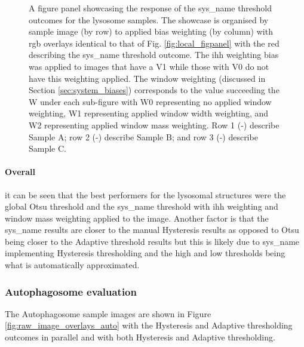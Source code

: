 \begin{figure}[h!]
    \caption[Figure panel showcasing the response of the different weighting biases on the system threshold outcomes for the lysosome samples]{A figure panel showcasing the response of the \gls{sys_name} threshold outcomes for the lysosome samples. The showcase is organised by sample image (by row) to applied bias weighting (by column) with \gls{rgb} overlays identical to that of Fig. \ref{fig:local_figpanel} with the red describing the \gls{sys_name} threshold outcome. The \gls{ihh} weighting bias was applied to images that have a V1 while those with V0 do not have this weighting applied. The window weighting (discussed in Section \ref{sec:system_biases}) corresponds to the value succeeding the W under each sub-figure with W0 representing no applied window weighting, W1 representing applied window width weighting, and W2 representing applied window mass weighting. Row 1 (-) describe Sample A; row 2 (-) describe Sample B; and row 3 (-) describe Sample C.} 
    \label{fig:local_ihh_figpanel}
\end{figure}

\paragraph{Overall} it can be seen that the best performers for the lysosomal structures were the global Otsu threshold and the \gls{sys_name} threshold with \gls{ihh} weighting and window mass weighting applied to the image. Another factor is that the \gls{sys_name} results are closer to the manual Hysteresis results as opposed to Otsu being closer to the Adaptive threshold results but this is likely due to \gls{sys_name} implementing Hysteresis thresholding and the high and low thresholds being what is automatically approximated. 


\clearpage
\subsubsection{Autophagosome evaluation}
The Autophagosome sample images are shown in Figure \ref{fig:raw_image_overlays_auto} with the Hysteresis and Adaptive thresholding outcomes in parallel and with both Hysteresis and Adaptive thresholding.

